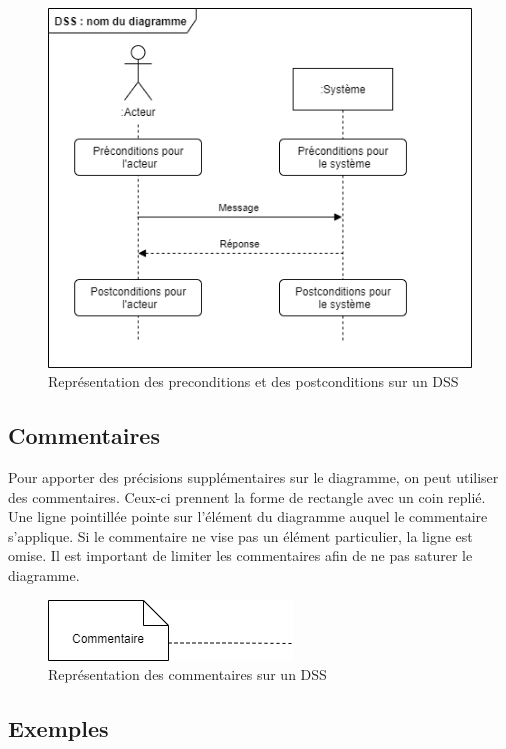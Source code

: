 \begin{figure}
	\caption{Représentation des \glspl{precondition} et des \glspl{postcondition} sur un \acrshort{DSS}}
	\centering
	\includegraphics[scale=0.6]{dss-pre-post.png}
\end{figure}

\FloatBarrier

\subsection{Commentaires}

Pour apporter des précisions supplémentaires sur le diagramme, on peut utiliser des commentaires. Ceux-ci prennent la forme de rectangle avec un coin replié. Une ligne pointillée pointe sur l'élément du diagramme auquel le commentaire s'applique. Si le commentaire ne vise pas un élément particulier, la ligne est omise. Il est important de limiter les commentaires afin de ne pas saturer le diagramme.

\begin{figure}
	\caption{Représentation des commentaires sur un \acrshort{DSS}}
	\centering
	\includegraphics[scale=0.6]{dss-commentaire.png}
\end{figure}

\FloatBarrier

\subsection{Exemples}

